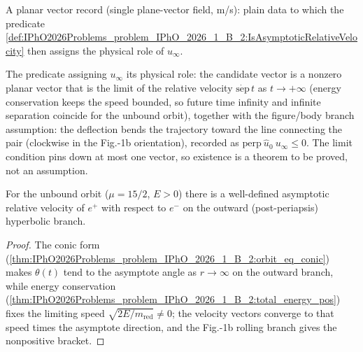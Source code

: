 \begin{definition}
\label{def:IPhO2026Problems_problem_IPhO_2026_1_B_2:RelativeVelocityVector}
A planar vector record (single plane-vector field, m/s): plain data to
which the predicate
\cref{def:IPhO2026Problems_problem_IPhO_2026_1_B_2:IsAsymptoticRelativeVelocity}
then assigns the physical role of $u_\infty$.
\end{definition}

\begin{definition}
\label{def:IPhO2026Problems_problem_IPhO_2026_1_B_2:IsAsymptoticRelativeVelocity}
The predicate assigning $u_\infty$ its physical role: the candidate vector
is a nonzero planar vector that is the limit of the relative velocity
$\dot{\mathrm{sep}}\,t$ as $t \to +\infty$ (energy conservation keeps the
speed bounded, so future time infinity and infinite separation coincide
for the unbound orbit), together with the figure/body branch assumption:
the deflection bends the trajectory toward the line connecting the pair
(clockwise in the Fig.-1b orientation), recorded as
$\mathrm{perp}\ \hat u_0\ u_\infty \le 0$.  The limit condition pins
down at most one vector, so existence is a theorem to be proved, not an
assumption.
\end{definition}

\begin{theorem}
\label{thm:IPhO2026Problems_problem_IPhO_2026_1_B_2:exists_asymptoticRelativeVelocity}
For the unbound orbit ($\mu = 15/2$, $E > 0$) there is a well-defined
asymptotic relative velocity of $e^+$ with respect to $e^-$ on the outward
(post-periapsis) hyperbolic branch.
\end{theorem}
\begin{proof}
The conic form
(\cref{thm:IPhO2026Problems_problem_IPhO_2026_1_B_2:orbit_eq_conic}) makes
$\theta(t)$ tend to the asymptote angle as $r \to \infty$ on the outward
branch, while energy conservation
(\cref{thm:IPhO2026Problems_problem_IPhO_2026_1_B_2:total_energy_pos})
fixes the limiting speed $\sqrt{2E/m_{\mathrm{red}}} \neq 0$; the velocity
vectors converge to that speed times the asymptote direction, and the
Fig.-1b rolling branch gives the nonpositive bracket.
\end{proof}

